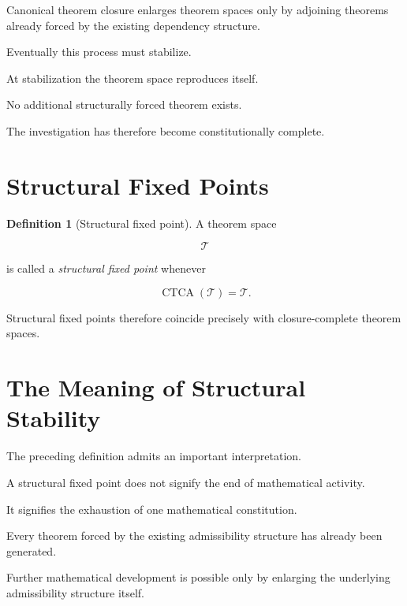 \documentclass[13pt,openany]{book}
\theoremstyle{plain}
\theoremstyle{definition}
\newtheorem{definition}{Definition}[chapter]
\begin{document}
Canonical theorem closure enlarges theorem spaces only by adjoining theorems
already forced by the existing dependency structure.

Eventually this process must stabilize.

At stabilization the theorem space reproduces itself.

No additional structurally forced theorem exists.

The investigation has therefore become constitutionally complete.

\section{Structural Fixed Points}

\begin{definition}[Structural fixed point]

A theorem space

\[
\mathcal T
\]

is called a \emph{structural fixed point} whenever

\[
\operatorname{CTCA}(\mathcal T)
=
\mathcal T.
\]

\end{definition}

Structural fixed points therefore coincide precisely with closure-complete
theorem spaces.

\section{The Meaning of Structural Stability}

The preceding definition admits an important interpretation.

A structural fixed point does not signify the end of mathematical activity.

It signifies the exhaustion of one mathematical constitution.

Every theorem forced by the existing admissibility structure has already been
generated.

Further mathematical development is possible only by enlarging the underlying
admissibility structure itself.
\end{document}
